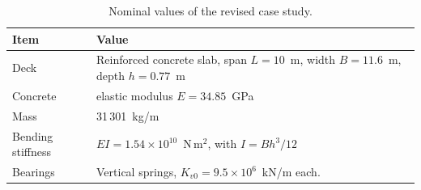 \documentclass[11pt]{article}
\newenvironment{action}{\par\smallskip\noindent\color{resp}\textbf{Action:}\ }{\par}
\newcommand{\tbd}[1]{\textcolor{note}{\textsf{[#1]}}}
\newcommand{\lines}[1]{\tbd{lines #1}}
\begin{document}
\begin{table}[H]
	\centering\small
	\caption{Nominal values of the revised case study.}
	\label{tab:specs}
	\footnotesize
	\begin{tabular}{p{3.0cm}p{6.6cm}}
		\toprule
		Item & Value \\
		\midrule
		Deck & Reinforced concrete slab, span $L=10$~m, width $B=11.6$~m, depth $h=0.77$~m \\
		Concrete & elastic modulus $E=34.85$~GPa \\
		Mass & 31\,301~kg/m  \\
		Bending stiffness & $EI=1.54\times10^{10}$~N\,m$^2$, with $I=Bh^3/12$ \\
		Bearings & Vertical springs, $K_{v0}=9.5\times10^{6}$~kN/m each. \\
		\bottomrule
	\end{tabular}
\end{table}


\end{document}
